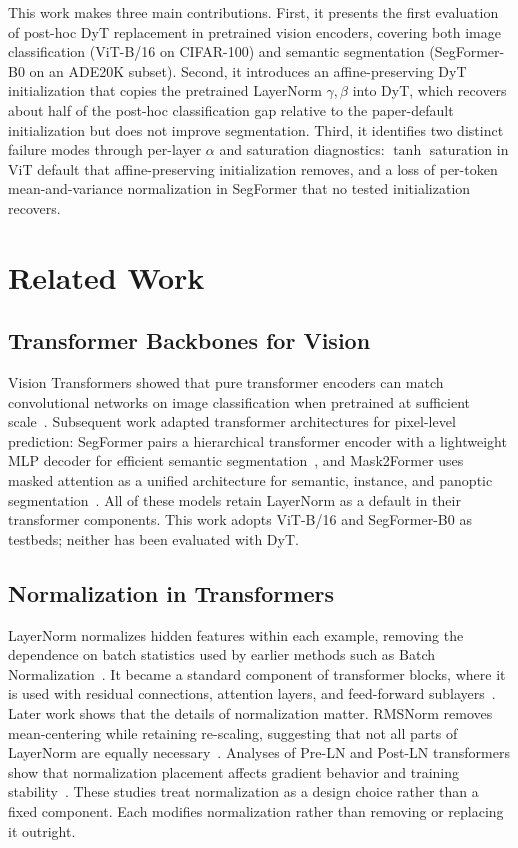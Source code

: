 \documentclass[10pt,twocolumn,letterpaper]{article}
\begin{document}
This work makes three main contributions. First, it presents the first evaluation of post-hoc DyT replacement in pretrained vision encoders, covering both image classification (ViT-B/16 on CIFAR-100) and semantic segmentation (SegFormer-B0 on an ADE20K subset). Second, it introduces an affine-preserving DyT initialization that copies the pretrained LayerNorm $\gamma, \beta$ into DyT, which recovers about half of the post-hoc classification gap relative to the paper-default initialization but does not improve segmentation. Third, it identifies two distinct failure modes through per-layer $\alpha$ and saturation diagnostics: $\tanh$ saturation in ViT default that affine-preserving initialization removes, and a loss of per-token mean-and-variance normalization in SegFormer that no tested initialization recovers.



\section{Related Work}
\label{sec:related}

\subsection{Transformer Backbones for Vision}

Vision Transformers showed that pure transformer encoders can match convolutional networks on image classification when pretrained at sufficient scale~\cite{dosovitskiy2021vit}. Subsequent work adapted transformer architectures for pixel-level prediction: SegFormer pairs a hierarchical transformer encoder with a lightweight MLP decoder for efficient semantic segmentation~\cite{xie2021segformer}, and Mask2Former uses masked attention as a unified architecture for semantic, instance, and panoptic segmentation~\cite{cheng2022mask2former}. All of these models retain LayerNorm as a default in their transformer components. This work adopts ViT-B/16 and SegFormer-B0 as testbeds; neither has been evaluated with DyT.

\subsection{Normalization in Transformers}

LayerNorm normalizes hidden features within each example, removing the dependence on batch statistics used by earlier methods such as Batch Normalization~\cite{ioffe2015batchnorm,ba2016layernorm}. It became a standard component of transformer blocks, where it is used with residual connections, attention layers, and feed-forward sublayers~\cite{vaswani2017attention}. Later work shows that the details of normalization matter. RMSNorm removes mean-centering while retaining re-scaling, suggesting that not all parts of LayerNorm are equally necessary~\cite{zhang2019rmsnorm}. Analyses of Pre-LN and Post-LN transformers show that normalization placement affects gradient behavior and training stability~\cite{xiong2020layernorm}. These studies treat normalization as a design choice rather than a fixed component. Each modifies normalization rather than removing or replacing it outright.
\end{document}

